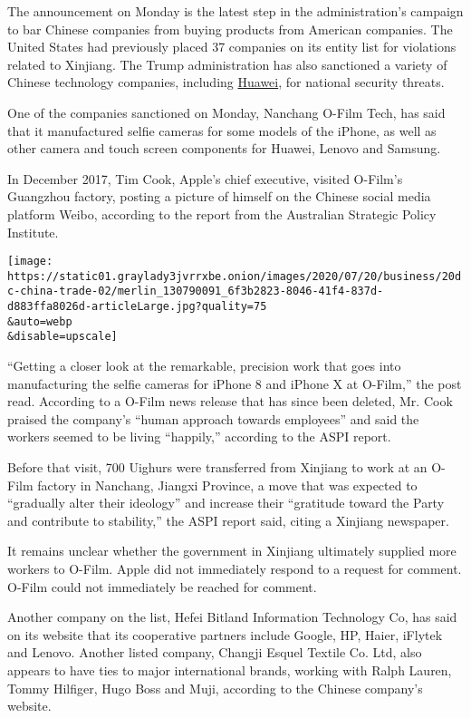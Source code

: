 The announcement on Monday is the latest step in the administration's
campaign to bar Chinese companies from buying products from American
companies. The United States had previously placed 37 companies on its
entity list for violations related to Xinjiang. The Trump administration
has also sanctioned a variety of Chinese technology companies, including
\href{https://www.nytimes3xbfgragh.onion/2020/05/15/business/economy/commerce-department-huawei.html}{Huawei},
for national security threats.

One of the companies sanctioned on Monday, Nanchang O-Film Tech, has
said that it manufactured selfie cameras for some models of the iPhone,
as well as other camera and touch screen components for Huawei, Lenovo
and Samsung.

In December 2017, Tim Cook, Apple's chief executive, visited O-Film's
Guangzhou factory, posting a picture of himself on the Chinese social
media platform Weibo, according to the report from the Australian
Strategic Policy Institute.

\texttt{[image: https://static01.graylady3jvrrxbe.onion/images/2020/07/20/business/20dc-china-trade-02/merlin\_130790091\_6f3b2823-8046-41f4-837d-d883ffa8026d-articleLarge.jpg?quality=75\\\&auto=webp\\\&disable=upscale]}

``Getting a closer look at the remarkable, precision work that goes into
manufacturing the selfie cameras for iPhone 8 and iPhone X at O-Film,''
the post read. According to a O-Film news release that has since been
deleted, Mr. Cook praised the company's ``human approach towards
employees'' and said the workers seemed to be living ``happily,''
according to the ASPI report.

Before that visit, 700 Uighurs were transferred from Xinjiang to work at
an O-Film factory in Nanchang, Jiangxi Province, a move that was
expected to ``gradually alter their ideology'' and increase their
``gratitude toward the Party and contribute to stability,'' the ASPI
report said, citing a Xinjiang newspaper.

It remains unclear whether the government in Xinjiang ultimately
supplied more workers to O-Film. Apple did not immediately respond to a
request for comment. O-Film could not immediately be reached for
comment.

Another company on the list, Hefei Bitland Information Technology Co,
has said on its website that its cooperative partners include Google,
HP, Haier, iFlytek and Lenovo. Another listed company, Changji Esquel
Textile Co. Ltd, also appears to have ties to major international
brands, working with Ralph Lauren, Tommy Hilfiger, Hugo Boss and Muji,
according to the Chinese company's website.

